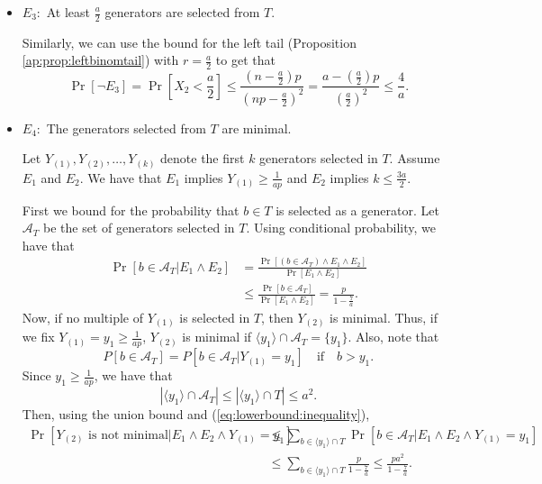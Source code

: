 \begin{itemize}
    \item $E_3:$ At least $\frac{a}{2}$ generators are selected from $T$. \par 
    Similarly, we can use the bound for the left tail (Proposition \ref{ap:prop:leftbinomtail}) with $r = \frac{a}{2}$ to get that
    \begin{equation}\label{eq:lowerbound:e3}
        \Pr[ \lnot E_3] = \Pr\left[X_2 < \frac{a}{2}\right] \leq  \frac{(n - \frac{a}{2})p}{(np - \frac{a}{2})^2} = \frac{a - (\frac{a}{2})p}{(\frac{a}{2})^2} \leq \frac{4}{a}.
    \end{equation}
    \item $E_4:$ The generators selected from $T$ are minimal.\par 
    Let $Y_{(1)}, Y_{(2)}, \ldots, Y_{(k)}$ denote the first $k$ generators selected in $T$. Assume $E_1$ and $E_2$. We have that $E_1$ implies $Y_{(1)} \geq \frac{1}{ap}$ and $E_2$ implies $k \leq \frac{3a}{2}$. \par
    First we bound for the probability that $b \in T$ is selected as a generator. Let $\mathcal{A}_T$ be the set of generators selected in $T$. Using conditional probability, we have that 
    \begin{align}
        \Pr[b \in \mathcal{A}_T|E_1 \land E_2] &= \frac{\Pr[(b \in \mathcal{A}_T)\land E_1 \land E_2]}{\Pr[E_1 \land E_2]} \\
        &\leq\frac{\Pr[b \in \mathcal{A}_T]}{\Pr[E_1 \land E_2]} = \frac{p}{1 - \frac{7}{a}}. \label{eq:lowerbound:inequality}
    \end{align}
    Now, if no multiple of $Y_{(1)}$ is selected in $T$, then $Y_{(2)}$ is minimal. Thus, if we fix $Y_{(1)} = y_1 \geq \frac{1}{ap}$, $Y_{(2)}$ is minimal if $\langle y_1 \rangle \cap  \mathcal{A}_T = \{y_1\}$. Also, note that
    \[P[b \in \mathcal{A}_T] = P[b \in \mathcal{A}_T|Y_{(1)} = y_1] \quad \text{if} \quad  b > y_1.\]
    Since $y_1 \geq \frac{1}{ap}$, we have that \[|\langle y_1 \rangle \cap  \mathcal{A}_T| \leq |\langle y_1 \rangle \cap T| \leq a^2.\] Then, using the union bound and (\ref{eq:lowerbound:inequality}),
    \begin{align*}
        \Pr[Y_{(2)} \text{ is not minimal}|E_1\land E_2 \land Y_{(1)} = y_1]&\leq \sum_{b \in\langle y_1\rangle \cap T}\Pr[b \in \mathcal{A}_T|E_1 \land E_2 \land Y_{(1)} = y_1]\\ 
        &\leq \sum_{b \in\langle y_1\rangle \cap T} \frac{p}{1 - \frac{7}{a}} \leq \frac{pa^2}{1 - \frac{7}{a}}.
    \end{align*}
        

\end{itemize}
